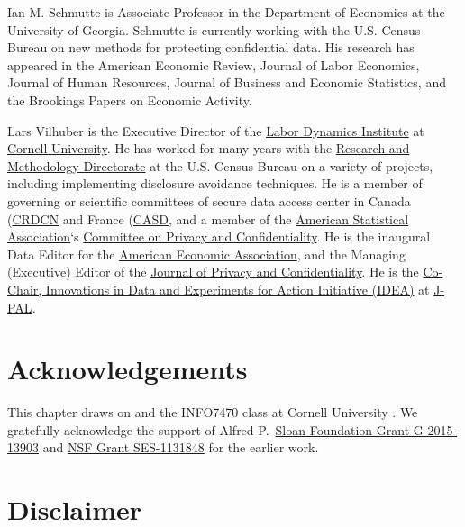 \documentclass[
]{book}
\begin{document}
Ian M. Schmutte is Associate Professor in the Department of Economics at the University of Georgia. Schmutte is currently working with the U.S. Census Bureau on new methods for protecting confidential data. His research has appeared in the American Economic Review, Journal of Labor Economics, Journal of Human Resources, Journal of Business and Economic Statistics, and the Brookings Papers on Economic Activity.

Lars Vilhuber is the Executive Director of the \href{http://www.ilr.cornell.edu/ldi}{Labor Dynamics Institute} at \href{http://www.cornell.edu}{Cornell University}. He has worked for many years with the \href{https://www.census.gov/research/}{Research and Methodology Directorate} at the U.S. Census Bureau on a variety of projects, including implementing disclosure avoidance techniques. He is a member of governing or scientific committees of secure data access center in Canada (\href{https://crdcn.org/}{CRDCN} and France (\href{http://casd.eu}{CASD}, and a member of the \href{https://www.amstat.org/}{American Statistical Association}`s \href{https://community.amstat.org/cpc/home}{Committee on Privacy and Confidentiality}. He is the inaugural Data Editor for the \href{https://www.aeaweb.org/}{American Economic Association}, and the Managing (Executive) Editor of the \href{https://journalprivacyconfidentiality.org/}{Journal of Privacy and Confidentiality}. He is the \href{https://www.povertyactionlab.org/initiative/innovations-data-experiments-action}{Co-Chair, Innovations in Data and Experiments for Action Initiative (IDEA)} at \href{https://www.povertyactionlab.org/}{J-PAL}.

\hypertarget{acknowledgements}{%
\section*{Acknowledgements}\label{acknowledgements}}

This chapter draws on \citet{abowd_introductory_2019} and the INFO7470 class at Cornell University \citep{abowd_session_2016}. We gratefully acknowledge the support of Alfred P.~\href{https://sloan.org/grant-detail/6845}{Sloan Foundation Grant G-2015-13903} and \href{http://www.nsf.gov/awardsearch/showAward.do?AwardNumber=1131848}{NSF Grant SES-1131848} for the earlier work.

\hypertarget{disclaimer}{%
\section*{Disclaimer}\label{disclaimer}}
\end{document}
